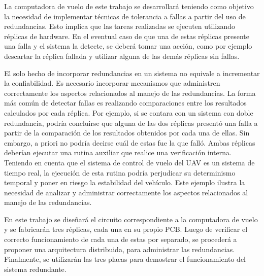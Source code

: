 La computadora de vuelo de este trabajo se desarrollará teniendo como objetivo la necesidad de implementar técnicas de tolerancia a fallas a partir del uso de redundancias. %
Esto implica que las tareas realizadas se ejecuten utilizando réplicas de hardware. En el eventual caso de que una de estas réplicas presente una falla y el sistema la detecte, se deberá tomar una acción, como por ejemplo descartar la réplica fallada y utilizar alguna de las demás réplicas sin fallas. 

El solo hecho de incorporar redundancias en un sistema no equivale a incrementar la confiabilidad. Es necesario incorporar mecanismos que administren correctamente los aspectos relacionados al manejo de las redundancias. La forma más común de detectar fallas es realizando comparaciones entre los resultados calculados por cada réplica. Por ejemplo, si se contara con un sistema con doble redundancia, podría concluirse que alguna de las dos réplicas presentó una falla a partir de la comparación de los resultados obtenidos por cada una de ellas. Sin embargo, a priori no podría decirse cuál de estas fue la que falló. Ambas réplicas deberían ejecutar una rutina auxiliar que realice una verificación interna. Teniendo en cuenta que el sistema de control de vuelo del UAV es un sistema de tiempo real, la ejecución de esta rutina podría perjudicar su determinismo temporal y poner en riesgo la estabilidad del vehículo. Este ejemplo ilustra la necesidad de analizar y administrar correctamente los aspectos relacionados al manejo de las redundancias.

En este trabajo se diseñará el circuito correspondiente a la computadora de vuelo y se fabricarán tres réplicas, cada una en su propio PCB. Luego de verificar el correcto funcionamiento de cada una de estas por separado, se procederá a proponer una arquitectura distribuida, para administrar las redundancias. Finalmente, se utilizarán las tres placas para demostrar el funcionamiento del sistema redundante.



